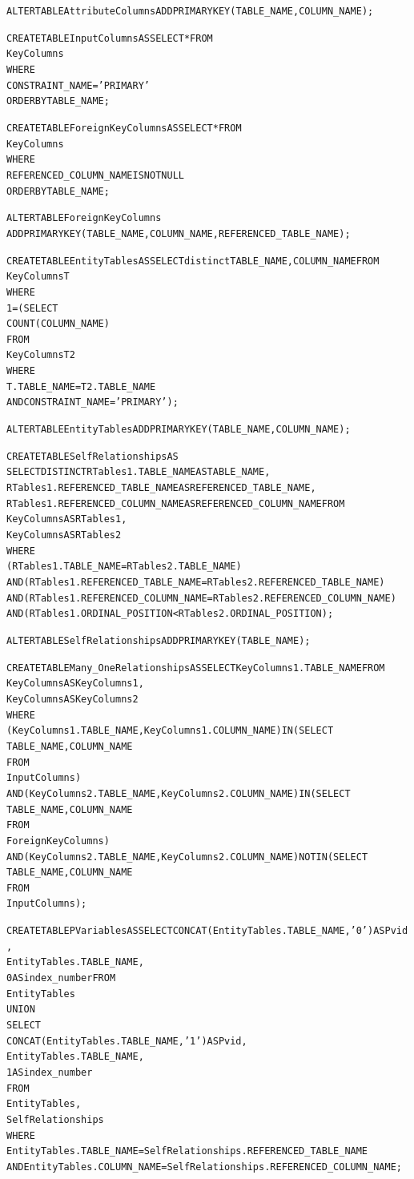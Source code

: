\documentclass{sfuthesis}
\begin{document}
\begin{appendices}
\begin{alltt}
ALTER TABLE AttributeColumns ADD PRIMARY KEY (TABLE_NAME,COLUMN_NAME);

CREATE TABLE InputColumns AS SELECT * FROM
KeyColumns
WHERE
CONSTRAINT_NAME = 'PRIMARY'
ORDER BY TABLE_NAME;

CREATE TABLE ForeignKeyColumns AS SELECT * FROM
KeyColumns
WHERE
REFERENCED_COLUMN_NAME IS NOT NULL
ORDER BY TABLE_NAME;

ALTER TABLE ForeignKeyColumns
 ADD PRIMARY KEY (TABLE_NAME,COLUMN_NAME,REFERENCED_TABLE_NAME);

CREATE TABLE EntityTables AS SELECT distinct TABLE_NAME, COLUMN_NAME FROM
KeyColumns T
WHERE
1 = (SELECT 
        COUNT(COLUMN_NAME)
    FROM
        KeyColumns T2
    WHERE
        T.TABLE_NAME = T2.TABLE_NAME
            AND CONSTRAINT_NAME = 'PRIMARY');

ALTER TABLE EntityTables ADD PRIMARY KEY (TABLE_NAME,COLUMN_NAME);

CREATE TABLE SelfRelationships AS
 SELECT DISTINCT RTables1.TABLE_NAME AS TABLE_NAME,
RTables1.REFERENCED_TABLE_NAME AS REFERENCED_TABLE_NAME,
RTables1.REFERENCED_COLUMN_NAME AS REFERENCED_COLUMN_NAME FROM
KeyColumns AS RTables1,
KeyColumns AS RTables2
WHERE
(RTables1.TABLE_NAME = RTables2.TABLE_NAME)
    AND (RTables1.REFERENCED_TABLE_NAME = RTables2.REFERENCED_TABLE_NAME)
    AND (RTables1.REFERENCED_COLUMN_NAME = RTables2.REFERENCED_COLUMN_NAME)
    AND (RTables1.ORDINAL_POSITION < RTables2.ORDINAL_POSITION);

ALTER TABLE SelfRelationships ADD PRIMARY KEY (TABLE_NAME);

CREATE TABLE Many_OneRelationships AS SELECT KeyColumns1.TABLE_NAME FROM
KeyColumns AS KeyColumns1,
KeyColumns AS KeyColumns2
WHERE
(KeyColumns1.TABLE_NAME , KeyColumns1.COLUMN_NAME) IN (SELECT 
        TABLE_NAME, COLUMN_NAME
    FROM
        InputColumns)
    AND (KeyColumns2.TABLE_NAME , KeyColumns2.COLUMN_NAME) IN (SELECT 
        TABLE_NAME, COLUMN_NAME
    FROM
        ForeignKeyColumns)
    AND (KeyColumns2.TABLE_NAME , KeyColumns2.COLUMN_NAME) NOT IN (SELECT 
        TABLE_NAME, COLUMN_NAME
    FROM
        InputColumns);

CREATE TABLE PVariables AS SELECT CONCAT(EntityTables.TABLE_NAME, '0') AS Pvid,
EntityTables.TABLE_NAME,
0 AS index_number FROM
EntityTables 
UNION 
SELECT 
CONCAT(EntityTables.TABLE_NAME, '1') AS Pvid,
EntityTables.TABLE_NAME,
1 AS index_number
FROM
EntityTables,
SelfRelationships
WHERE
EntityTables.TABLE_NAME = SelfRelationships.REFERENCED_TABLE_NAME
    AND EntityTables.COLUMN_NAME = SelfRelationships.REFERENCED_COLUMN_NAME ;


\end{alltt}
\end{appendices}
\end{document}
